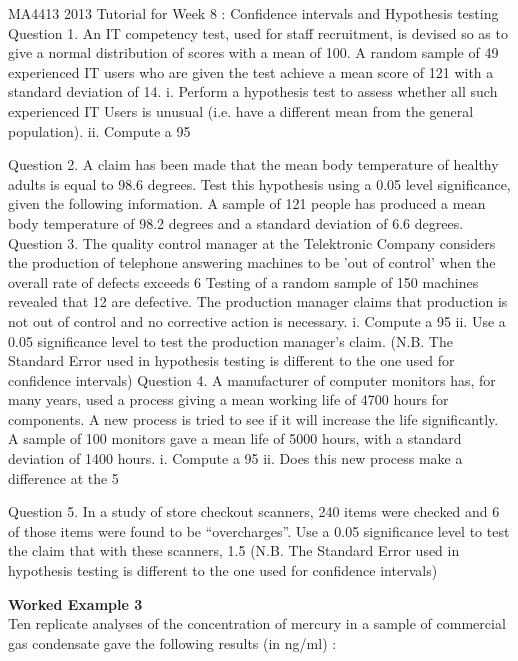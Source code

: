 MA4413 2013 Tutorial for Week 8 : Confidence intervals and Hypothesis testing
Question 1. 
An IT competency test, used for staff recruitment, is devised so as to give a normal distribution of scores with a mean of 100. A random sample of 49 experienced IT users who are given the test achieve a mean score of 121 with a standard deviation of 14. 
i.	Perform a hypothesis test to assess whether all such experienced IT Users is unusual (i.e. have a different mean from the general population).
ii.	Compute a 95%

Question 2.
A claim has been made that the mean body temperature of healthy adults is equal to 98.6 degrees. Test this hypothesis using a 0.05 level significance, given the following information.
A sample of 121 people has produced a mean body temperature of 98.2 degrees and a standard deviation of 6.6 degrees.  
Question 3.
The quality control manager at the Telektronic Company considers the production of telephone answering machines to be ’out of control’ when the overall rate of defects exceeds 6%
Testing of a random sample of 150 machines revealed that 12 are defective. The production manager claims that production is not out of control and no corrective action is necessary.
i.	Compute a 95%
ii.	Use a 0.05 significance level to test the production manager’s claim.
(N.B. The Standard Error used in hypothesis testing is different to the one used for confidence intervals)
Question 4.
A manufacturer of computer monitors  has, for many years, used a process giving a mean  working life of 4700 hours  for components.
A new process is tried to see if it will increase the life significantly. A sample of 100 monitors gave a mean life of 5000 hours, with a standard deviation of 1400 hours.
i.	Compute a 95%
ii.	Does this new process make a difference at the 5%




Question 5.
In a study of store checkout scanners, 240 items were checked and 6 of those items were found to be “overcharges”.
Use a 0.05 significance level to test the claim that with these scanners, 1.5 %
(N.B. The Standard Error used in hypothesis testing is different to the one used for confidence intervals)

	\item \textbf{Worked Example 3} \\ Ten replicate analyses of the concentration
	of mercury in a sample of commercial gas condensate gave the
	following results (in ng/ml) :
	
